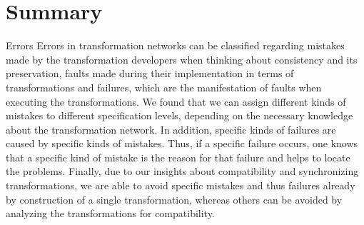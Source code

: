 




\section{Summary}

\begin{insight}{Errors}
    Errors in transformation networks can be classified regarding mistakes made by the transformation developers when thinking about consistency and its preservation, faults made during their implementation in terms of transformations and failures, which are the manifestation of faults when executing the transformations.
    We found that we can assign different kinds of mistakes to different specification levels, depending on the necessary knowledge about the transformation network.
    In addition, specific kinds of failures are caused by specific kinds of mistakes.
    Thus, if a specific failure occurs, one knows that a specific kind of mistake is the reason for that failure and helps to locate the problems.
    Finally, due to our insights about compatibility and synchronizing transformations, we are able to avoid specific mistakes and thus failures already by construction of a single transformation, whereas others can be avoided by analyzing the transformations for compatibility.
\end{insight}